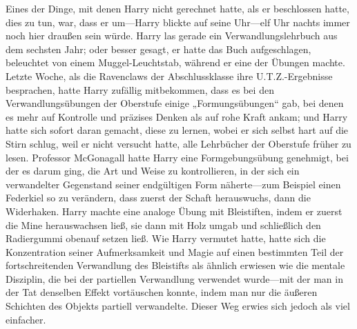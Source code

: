 Eines der Dinge, mit denen Harry nicht gerechnet hatte, als er beschlossen hatte, dies zu tun, war, dass er um—Harry blickte auf seine Uhr—elf Uhr nachts immer noch hier draußen sein würde. Harry las gerade ein Verwandlungslehrbuch aus dem sechsten Jahr; oder besser gesagt, er hatte das Buch aufgeschlagen, beleuchtet von einem Muggel-Leuchtstab, während er eine der Übungen machte. Letzte Woche, als die Ravenclaws der Abschlussklasse ihre U.T.Z.-Ergebnisse besprachen, hatte Harry zufällig mitbekommen, dass es bei den Verwandlungsübungen der Oberstufe einige „Formungsübungen“ gab, bei denen es mehr auf Kontrolle und präzises Denken als auf rohe Kraft ankam; und Harry hatte sich sofort daran gemacht, diese zu lernen, wobei er sich selbst hart auf die Stirn schlug, weil er nicht versucht hatte, alle Lehrbücher der Oberstufe früher zu lesen. Professor McGonagall hatte Harry eine Formgebungsübung genehmigt, bei der es darum ging, die Art und Weise zu kontrollieren, in der sich ein verwandelter Gegenstand seiner endgültigen Form näherte—zum Beispiel einen Federkiel so zu verändern, dass zuerst der Schaft herauswuchs, dann die Widerhaken. Harry machte eine analoge Übung mit Bleistiften, indem er zuerst die Mine herauswachsen ließ, sie dann mit Holz umgab und schließlich den Radiergummi obenauf setzen ließ. Wie Harry vermutet hatte, hatte sich die Konzentration seiner Aufmerksamkeit und Magie auf einen bestimmten Teil der fortschreitenden Verwandlung des Bleistifts als ähnlich erwiesen wie die mentale Disziplin, die bei der partiellen Verwandlung verwendet wurde—mit der man in der Tat denselben Effekt vortäuschen konnte, indem man nur die äußeren Schichten des Objekts partiell verwandelte. Dieser Weg erwies sich jedoch als viel einfacher.

